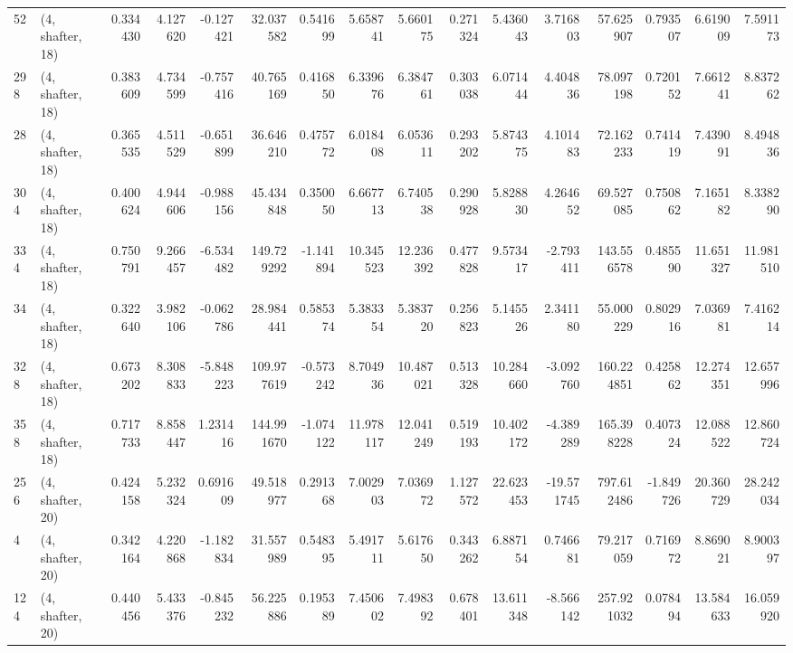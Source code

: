 \begin{tabular}{llrrrrrrrrrrrrrr}
52  &  (4, shafter, 18) &   0.334430 &   4.127620 &  -0.127421 &    32.037582 &   0.541699 &   5.658741 &   5.660175 &  0.271324 &   5.436043 &   3.716803 &    57.625907 &  0.793507 &   6.619009 &   7.591173 \\
298 &  (4, shafter, 18) &   0.383609 &   4.734599 &  -0.757416 &    40.765169 &   0.416850 &   6.339676 &   6.384761 &  0.303038 &   6.071444 &   4.404836 &    78.097198 &  0.720152 &   7.661241 &   8.837262 \\
28  &  (4, shafter, 18) &   0.365535 &   4.511529 &  -0.651899 &    36.646210 &   0.475772 &   6.018408 &   6.053611 &  0.293202 &   5.874375 &   4.101483 &    72.162233 &  0.741419 &   7.439091 &   8.494836 \\
304 &  (4, shafter, 18) &   0.400624 &   4.944606 &  -0.988156 &    45.434848 &   0.350050 &   6.667713 &   6.740538 &  0.290928 &   5.828830 &   4.264652 &    69.527085 &  0.750862 &   7.165182 &   8.338290 \\
334 &  (4, shafter, 18) &   0.750791 &   9.266457 &  -6.534482 &   149.729292 &  -1.141894 &  10.345523 &  12.236392 &  0.477828 &   9.573417 &  -2.793411 &   143.556578 &  0.485590 &  11.651327 &  11.981510 \\
34  &  (4, shafter, 18) &   0.322640 &   3.982106 &  -0.062786 &    28.984441 &   0.585374 &   5.383354 &   5.383720 &  0.256823 &   5.145526 &   2.341180 &    55.000229 &  0.802916 &   7.036981 &   7.416214 \\
328 &  (4, shafter, 18) &   0.673202 &   8.308833 &  -5.848223 &   109.977619 &  -0.573242 &   8.704936 &  10.487021 &  0.513328 &  10.284660 &  -3.092760 &   160.224851 &  0.425862 &  12.274351 &  12.657996 \\
358 &  (4, shafter, 18) &   0.717733 &   8.858447 &   1.231416 &   144.991670 &  -1.074122 &  11.978117 &  12.041249 &  0.519193 &  10.402172 &  -4.389289 &   165.398228 &  0.407324 &  12.088522 &  12.860724 \\
256 &  (4, shafter, 20) &   0.424158 &   5.232324 &   0.691609 &    49.518977 &   0.291368 &   7.002903 &   7.036972 &  1.127572 &  22.623453 & -19.571745 &   797.612486 & -1.849726 &  20.360729 &  28.242034 \\
4   &  (4, shafter, 20) &   0.342164 &   4.220868 &  -1.182834 &    31.557989 &   0.548395 &   5.491711 &   5.617650 &  0.343262 &   6.887154 &   0.746681 &    79.217059 &  0.716972 &   8.869021 &   8.900397 \\
124 &  (4, shafter, 20) &   0.440456 &   5.433376 &  -0.845232 &    56.225886 &   0.195389 &   7.450602 &   7.498392 &  0.678401 &  13.611348 &  -8.566142 &   257.921032 &  0.078494 &  13.584633 &  16.059920 \\

\end{tabular}
